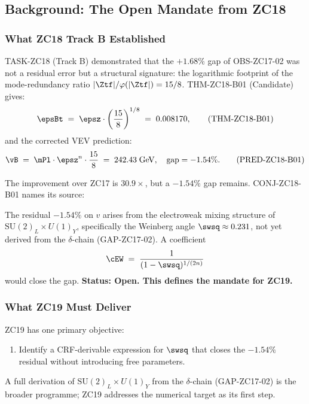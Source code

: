 \documentclass[12pt, a4paper]{article}
\begin{document}
\tableofcontents
\newpage

\subsection{Background: The Open Mandate from ZC18}
\label{zc19:sec:background}

\subsubsection{What ZC18 Track B Established}

TASK-ZC18 (Track B) demonstrated that the $+1.68\%$ gap of OBS-ZC17-02
was not a residual error but a structural signature: the logarithmic
footprint of the mode-redundancy ratio $|\Ztf|/\varphi(|\Ztf|) = 15/8$.
THM-ZC18-B01 (Candidate) gives:
\begin{equation}
  \epsBt \;=\; \epsz \cdot \left(\frac{15}{8}\right)^{1/8}
  \;=\; 0.008170,
  \tag{THM-ZC18-B01}
\end{equation}
and the corrected VEV prediction:
\begin{equation}
  \vB \;=\; \mPl\cdot\epsz^n\cdot\frac{15}{8}
  \;=\; 242.43\;\mathrm{GeV},
  \quad \text{gap} = -1.54\%.
  \tag{PRED-ZC18-B01}
\end{equation}

The improvement over ZC17 is $30.9\times$, but a $-1.54\%$ gap
remains. CONJ-ZC18-B01 names its source:

\begin{openqbox}[title={CONJ-ZC18-B01 (Inherited) --- EW Mixing Residual}]
The residual $-1.54\%$ on $v$ arises from the electroweak mixing
structure of $\mathrm{SU}(2)_L\times U(1)_Y$, specifically the
Weinberg angle $\swsq \approx 0.231$, not yet derived from the
$\delta$-chain (GAP-ZC17-02).
A coefficient
\[
  \cEW \;=\; \frac{1}{(1-\swsq)^{1/(2n)}}
\]
would close the gap.
\textbf{Status: Open. This defines the mandate for ZC19.}
\end{openqbox}

\subsubsection{What ZC19 Must Deliver}

ZC19 has one primary objective:
\begin{enumerate}[leftmargin=*, noitemsep]
  \item Identify a CRF-derivable expression for $\swsq$ that closes
    the $-1.54\%$ residual without introducing free parameters.
\end{enumerate}
A full derivation of $\mathrm{SU}(2)_L\times U(1)_Y$ from the
$\delta$-chain (GAP-ZC17-02) is the broader programme; ZC19
addresses the numerical target as its first step.
\end{document}
